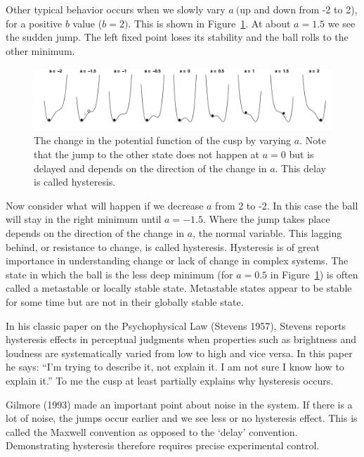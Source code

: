 \documentclass[
  a4paper,
  DIV=11,
  numbers=noendperiod]{scrreprt}
\begin{document}
Other typical behavior occurs when we slowly vary \(a\ (\)up and down
from -2 to 2), for a positive \(b\) value (\(b = 2).\) This is shown in
Figure~\ref{fig-ch3-img7-old-19}. At about \(a = 1.5\) we see the sudden
jump. The left fixed point loses its stability and the ball rolls to the
other minimum.

\begin{figure}

{\centering \includegraphics{media/ch3/image7.jpg}

}

\caption{\label{fig-ch3-img7-old-19}The change in the potential function
of the cusp by varying \(a\). Note that the jump to the other state does
not happen at \(a=0\) but is delayed and depends on the direction of the
change in \(a\). This delay is called hysteresis.}

\end{figure}

Now consider what will happen if we decrease \(a\) from 2 to -2. In this
case the ball will stay in the right minimum until \(a = - 1.5\). Where
the jump takes place depends on the direction of the change in \(a\),
the normal variable. This lagging behind, or resistance to change, is
called hysteresis. Hysteresis is of great importance in understanding
change or lack of change in complex systems. The state in which the ball
is the less deep minimum (for \(a = 0.5\) in
Figure~\ref{fig-ch3-img7-old-19}) is often called a metastable or
locally stable state. Metastable states appear to be stable for some
time but are not in their globally stable state.

In his classic paper on the Psychophysical Law (Stevens 1957), Stevens
reports hysteresis effects in perceptual judgments when properties such
as brightness and loudness are systematically varied from low to high
and vice versa. In this paper he says: ``I'm trying to describe it, not
explain it. I am not sure I know how to explain it.'' To me the cusp at
least partially explains why hysteresis occurs.

Gilmore (1993) made an important point about noise in the system. If
there is a lot of noise, the jumps occur earlier and we see less or no
hysteresis effect. This is called the Maxwell convention as opposed to
the `delay' convention. Demonstrating hysteresis therefore requires
precise experimental control.
\end{document}
